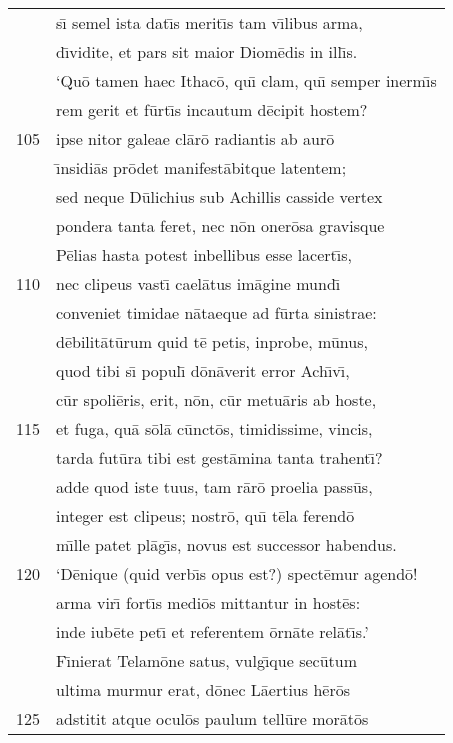 \documentclass[paper=6in:9in,pagesize=pdftex,
               headinclude=on,footinclude=on,12pt]{scrbook}
\begin{document}
\begin{longtable}[p]{ r l }
 & s\={\i} semel ista dat\={\i}s merit\={\i}s tam v\={\i}libus arma,\\ 
 & d\={\i}vidite, et pars sit maior Diom\=edis in ill\={\i}s.\\ 
 & \indent `Qu\=o tamen haec Ithac\=o, qu\={\i} clam, qu\={\i} semper inerm\={\i}s\\ 
 & rem gerit et f\=urt\={\i}s incautum d\=ecipit hostem?\\ 
105 & ipse nitor galeae cl\=ar\=o radiantis ab aur\=o\\ 
 & \={\i}nsidi\=as pr\=odet manifest\=abitque latentem;\\ 
 & sed neque D\=ulichius sub Achillis casside vertex\\ 
 & pondera tanta feret, nec n\=on oner\=osa gravisque\\ 
 & P\=elias hasta potest inbellibus esse lacert\={\i}s,\\ 
110 & nec clipeus vast\={\i} cael\=atus im\=agine mund\={\i}\\ 
 & conveniet timidae n\=ataeque ad f\=urta sinistrae:\\ 
 & d\=ebilit\=at\=urum quid t\=e petis, inprobe, m\=unus,\\ 
 & quod tibi s\={\i} popul\={\i} d\=on\=averit error Ach\={\i}v\={\i},\\ 
 & c\=ur spoli\=eris, erit, n\=on, c\=ur metu\=aris ab hoste,\\ 
115 & et fuga, qu\=a s\=ol\=a c\=unct\=os, timidissime, vincis,\\ 
 & tarda fut\=ura tibi est gest\=amina tanta trahent\={\i}?\\ 
 & adde quod iste tuus, tam r\=ar\=o proelia pass\=us,\\ 
 & integer est clipeus; nostr\=o, qu\={\i} t\=ela ferend\=o\\ 
 & m\={\i}lle patet pl\=ag\={\i}s, novus est successor habendus.\\ 
120 & \indent `D\=enique (quid verb\={\i}s opus est?) spect\=emur agend\=o!\\ 
 & arma vir\={\i} fort\={\i}s medi\=os mittantur in host\=es:\\ 
 & inde iub\=ete pet\={\i} et referentem \=orn\=ate rel\=at\={\i}s.'\\ 
 & \indent F\={\i}nierat Telam\=one satus, vulg\={\i}que sec\=utum\\ 
 & ultima murmur erat, d\=onec L\=aertius h\=er\=os\\ 
125 & adstitit atque ocul\=os paulum tell\=ure mor\=at\=os\\ 

\end{longtable}
\end{document}
